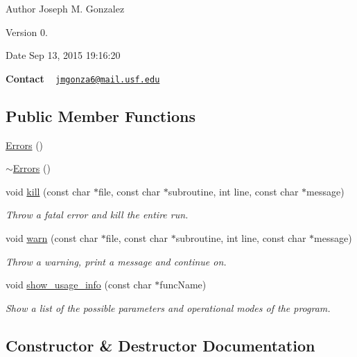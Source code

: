 \begin{DoxyAuthor}{Author}
Joseph M. Gonzalez
\end{DoxyAuthor}
\begin{DoxyVersion}{Version}
0.
\end{DoxyVersion}
\begin{DoxyDate}{Date}
Sep 13, 2015 19\+:16\+:20
\end{DoxyDate}
{\bfseries Contact} ~\newline
 \href{mailto:jmgonza6@mail.usf.edu}{\tt jmgonza6@mail.\+usf.\+edu} \subsection*{Public Member Functions}
\begin{DoxyCompactItemize}
\item 
\hyperlink{class_errors_aa266bfe6d658cd3e169b18277b902e56}{Errors} ()
\item 
\hyperlink{class_errors_ae7e127294d7af8814b4141eb82cdf80e}{$\sim$\+Errors} ()
\item 
void \hyperlink{class_errors_a7edc156cbfe343a26fbae1d6f6bdd215}{kill} (const char $\ast$file, const char $\ast$subroutine, int line, const char $\ast$message)
\begin{DoxyCompactList}\small\item\em Throw a fatal error and kill the entire run. \end{DoxyCompactList}\item 
void \hyperlink{class_errors_a7f4042d6992ae40907919a2494cf2c80}{warn} (const char $\ast$file, const char $\ast$subroutine, int line, const char $\ast$message)
\begin{DoxyCompactList}\small\item\em Throw a warning, print a message and continue on. \end{DoxyCompactList}\item 
void \hyperlink{class_errors_a3fbf3565c28224fe193828677cb8a277}{show\+\_\+usage\+\_\+info} (const char $\ast$func\+Name)
\begin{DoxyCompactList}\small\item\em Show a list of the possible parameters and operational modes of the program. \end{DoxyCompactList}\end{DoxyCompactItemize}


\subsection{Constructor \& Destructor Documentation}
\hypertarget{class_errors_aa266bfe6d658cd3e169b18277b902e56}{}
